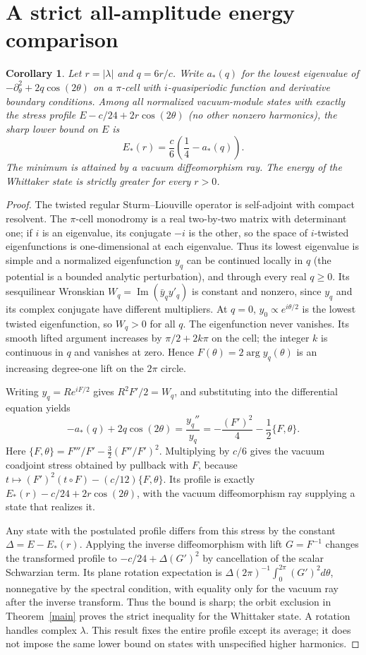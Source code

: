 \documentclass[11pt]{article}
\newtheorem{corollary}{Corollary}
\begin{document}
\section{A strict all-amplitude energy comparison}
\begin{corollary}\label{energy}
Let $r=|\lambda|$ and $q=6r/c$. Write $a_*(q)$ for the lowest eigenvalue of
$-\partial_\theta^2+2q\cos(2\theta)$ on a $\pi$-cell with $i$-quasiperiodic function and derivative boundary conditions. Among all normalized vacuum-module states with exactly the stress profile $E-c/24+2r\cos(2\theta)$ (no other nonzero harmonics), the sharp lower bound on $E$ is
\[
 E_*(r)=\frac c6\left(\frac14-a_*(q)\right).
\]
The minimum is attained by a vacuum diffeomorphism ray. The energy of the Whittaker state is strictly greater for every $r>0$.
\end{corollary}
\begin{proof}
The twisted regular Sturm--Liouville operator is self-adjoint with compact resolvent. The $\pi$-cell monodromy is a real two-by-two matrix with determinant one; if $i$ is an eigenvalue, its conjugate $-i$ is the other, so the space of $i$-twisted eigenfunctions is one-dimensional at each eigenvalue. Thus its lowest eigenvalue is simple and a normalized eigenfunction $y_q$ can be continued locally in $q$ (the potential is a bounded analytic perturbation), and through every real $q\ge0$. Its sesquilinear Wronskian $W_q=\operatorname{Im}(\bar y_q y'_q)$ is constant and nonzero, since $y_q$ and its complex conjugate have different multipliers. At $q=0$, $y_0\propto e^{i\theta/2}$ is the lowest twisted eigenfunction, so $W_q>0$ for all $q$. The eigenfunction never vanishes. Its smooth lifted argument increases by $\pi/2+2k\pi$ on the cell; the integer $k$ is continuous in $q$ and vanishes at zero. Hence $F(\theta)=2\arg y_q(\theta)$ is an increasing degree-one lift on the $2\pi$ circle.

Writing $y_q=R e^{iF/2}$ gives $R^2F'/2=W_q$, and substituting into the differential equation yields
\[
  -a_*(q)+2q\cos(2\theta)=\frac{y_q''}{y_q}
  =-\frac{(F')^2}{4}-\frac12\{F,\theta\}.
\]
Here $\{F,\theta\}=F'''/F'-\frac32(F''/F')^2$. Multiplying by $c/6$ gives the vacuum coadjoint stress obtained by pullback with $F$, because
$t\mapsto(F')^2(t\circ F)-(c/12)\{F,\theta\}$. Its profile is exactly $E_*(r)-c/24+2r\cos(2\theta)$, with the vacuum diffeomorphism ray supplying a state that realizes it.

Any state with the postulated profile differs from this stress by the constant $\Delta=E-E_*(r)$. Applying the inverse diffeomorphism with lift $G=F^{-1}$ changes the transformed profile to $-c/24+\Delta(G')^2$ by cancellation of the scalar Schwarzian term. Its plane rotation expectation is
$\Delta(2\pi)^{-1}\int_0^{2\pi}(G')^2d\theta$, nonnegative by the spectral condition, with equality only for the vacuum ray after the inverse transform. Thus the bound is sharp; the orbit exclusion in Theorem~\ref{main} proves the strict inequality for the Whittaker state. A rotation handles complex $\lambda$. This result fixes the entire profile except its average; it does not impose the same lower bound on states with unspecified higher harmonics.
\end{proof}
\end{document}

